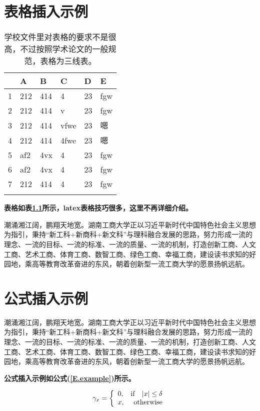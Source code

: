 \chapter{表格插入示例}

\begin{table}[htb]
  \centering
  \caption{学校文件里对表格的要求不是很高，不过按照学术论文的一般规范，表格为三线表。}
  \label{T.example}
  \begin{tabular}{llllll}
  \hline
   & A  & B  & C  & D  & E \\
  \hline
1 	& 212 & 414 & 4 		& 23 & fgw	\\
2 	& 212 & 414 & v 		& 23 & fgw	\\
3 	& 212 & 414 & vfwe		& 23 & 嗯	\\
4 	& 212 & 414 & 4fwe		& 23 & 嗯	\\
5 	& af2 & 4vx & 4 		& 23 & fgw	\\
6 	& af2 & 4vx & 4 		& 23 & fgw	\\
7 	& 212 & 414 & 4 		& 23 & fgw	\\

\hline{}
\end{tabular}
\end{table}

\textbf{表格如表\ref{T.example}所示，latex表格技巧很多，这里不再详细介绍。}

潮涌湘江阔，鹏翔天地宽。湖南工商大学正以习近平新时代中国特色社会主义思想为指引，秉持“新工科+新商科+新文科”与理科融合发展的思路，努力形成一流的理念、一流的目标、一流的标准、一流的质量、一流的机制，打造创新工商、人文工商、艺术工商、体育工商、数智工商、绿色工商、幸福工商，建设读书求知的好园地，乘高等教育改革奋进的东风，朝着创新型一流工商大学的愿景扬帆远航。


\newpage

\chapter{公式插入示例}

潮涌湘江阔，鹏翔天地宽。湖南工商大学正以习近平新时代中国特色社会主义思想为指引，秉持“新工科+新商科+新文科”与理科融合发展的思路，努力形成一流的理念、一流的目标、一流的标准、一流的质量、一流的机制，打造创新工商、人文工商、艺术工商、体育工商、数智工商、绿色工商、幸福工商，建设读书求知的好园地，乘高等教育改革奋进的东风，朝着创新型一流工商大学的愿景扬帆远航。


\textbf{公式插入示例如公式(\ref{E.example})所示。}

\begin{equation}
\gamma_{x}=
\left\{
  \begin{array}{lr}
  0, & {\rm if}~~\;|x| \leq \delta \\
  x, & {\rm otherwise}
  \end{array}
\right.
\label{E.example}
\end{equation}


\newpage
